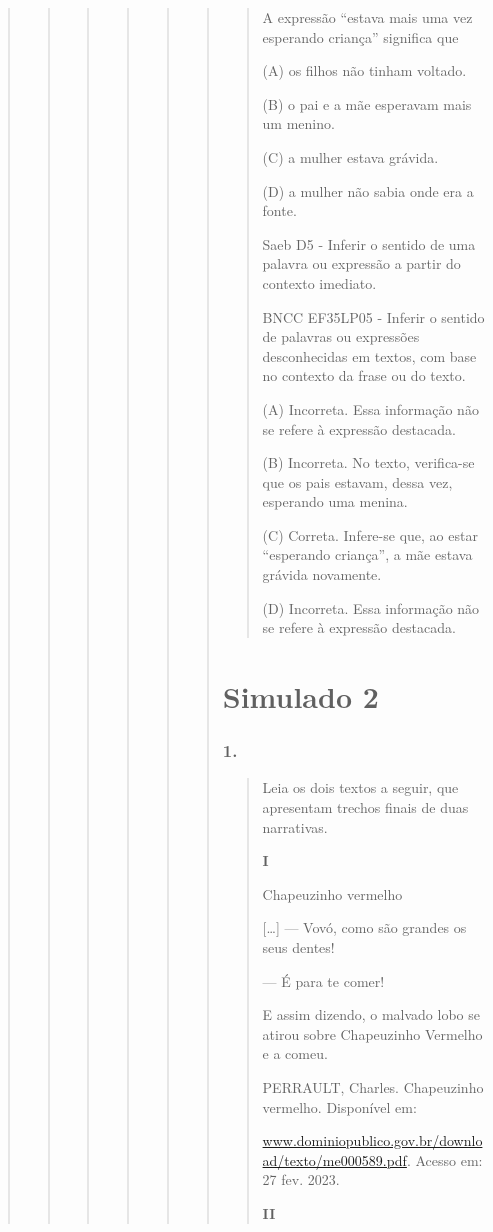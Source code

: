 \begin{quote}
\begin{quote}
\begin{quote}
\begin{quote}
\begin{quote}
\begin{quote}
\begin{quote}
A expressão ``estava mais uma vez esperando criança'' significa que

(A) os filhos não tinham voltado.

(B) o pai e a mãe esperavam mais um menino.

(C) a mulher estava grávida.

(D) a mulher não sabia onde era a fonte.

Saeb D5 - Inferir o sentido de uma palavra ou expressão a partir do
contexto imediato.

BNCC EF35LP05 - Inferir o sentido de palavras ou expressões
desconhecidas em textos, com base no contexto da frase ou do texto.

(A) Incorreta. Essa informação não se refere à expressão destacada.

(B) Incorreta. No texto, verifica-se que os pais estavam, dessa vez,
esperando uma menina.

(C) Correta. Infere-se que, ao estar ``esperando criança'', a mãe estava
grávida novamente.

(D) Incorreta. Essa informação não se refere à expressão destacada.
\end{quote}

\section{Simulado 2}\label{simulado-2}

\subsubsection{1. }\label{section-84}

\begin{quote}
Leia os dois textos a seguir, que apresentam trechos finais de duas
narrativas.

\textbf{I}

Chapeuzinho vermelho

{[}\ldots{}{]} --- Vovó, como são grandes os seus dentes!

--- É para te comer!

E assim dizendo, o malvado lobo se atirou sobre Chapeuzinho Vermelho e a
comeu.

PERRAULT, Charles. Chapeuzinho vermelho. Disponível em:

\href{http://www.dominiopublico.gov.br/download/texto/me000589.pdf}{www.dominiopublico.gov.br/download/texto/me000589.pdf}.
Acesso em: 27 fev. 2023.

\textbf{II}


\end{quote}
\end{quote}
\end{quote}
\end{quote}
\end{quote}
\end{quote}
\end{quote}
